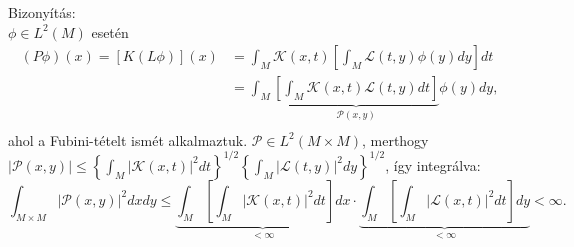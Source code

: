 \documentclass[12pt,a4paper]{scrartcl}
\newenvironment{bizonyitas}{}{}
\begin{document}
\begin{bizonyitas}

Bizonyítás:\\
\(\phi \in L^{2}\left( M \right)\) esetén \[\begin{aligned}
  \left( {P\phi } \right)\left( x \right) = \left[ {K\left( {L\phi } \right)} \right]\left( x \right) &  = \int_M {\mathcal{K}\left( {x,t} \right)\left[ {\int_M {\mathcal{L}\left( {t,y} \right)\phi \left( y \right)dy} } \right]dt}  \\ 
   &  = \int_M {\underbrace {\left[ {\int_M {\mathcal{K}\left( {x,t} \right)\mathcal{L}\left( {t,y} \right)dt} } \right]}_{\mathcal{P}\left( {x,y} \right)}\phi \left( y \right)dy} , \\ 
\end{aligned} \] ahol a Fubini-tételt ismét alkalmaztuk.
\(\mathcal{P} \in L^{2}\left( {M \times M} \right)\), merthogy
\(\left| {\mathcal{P}\left( {x,y} \right)} \right| \leq \left\{ {\int_{M}{\left| {\mathcal{K}\left( {x,t} \right)} \right|^{2}dt}} \right\}^{1/2}\left\{ {\int_{M}{\left| {\mathcal{L}\left( {t,y} \right)} \right|^{2}dy}} \right\}^{1/2}\),
így integrálva:
\[\int_{M \times M} {{{\left| {\mathcal{P}\left( {x,y} \right)} \right|}^2}dxdy}  \leqslant \underbrace {\int_M {\left[ {\int_M {{{\left| {\mathcal{K}\left( {x,t} \right)} \right|}^2}dt} } \right]dx} }_{ < \infty } \cdot \underbrace {\int_M {\left[ {\int_M {{{\left| {\mathcal{L}\left( {x,t} \right)} \right|}^2}dt} } \right]dy} }_{ < \infty } < \infty .\]

\end{bizonyitas}
\end{document}
